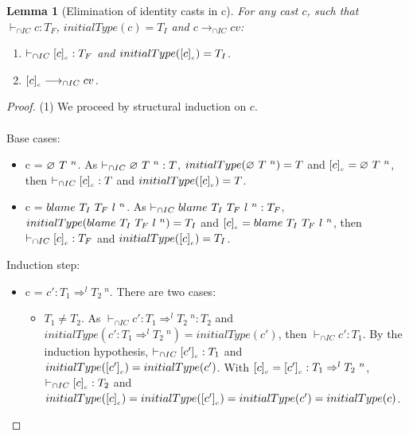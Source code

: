 \documentclass[a4paper]{article}
\newtheorem{lemma}{Lemma}
\begin{document}
\begin{lemma}[Elimination of identity casts in c]
\label{eliminationidentitycastsc}
For any cast $c$, such that $\vdash_{\cap IC} c : T_F$, $initialType(c) = T_I$ and $c \longrightarrow_{\cap IC} cv$:
\begin{enumerate}
    \item $\vdash_{\cap IC} [c]_{_c} : T_F$ and $initialType([c]_{_c}) = T_I$.
    \item $[c]_{_c} \longrightarrow_{\cap IC} cv$.
\end{enumerate}
\end{lemma}
\begin{proof}
(1) We proceed by structural induction on $c$.\\\\
Base cases:
\begin{itemize}
    \item c = $\varnothing\ T\ ^{n}$.
    As $\vdash_{\cap IC} \varnothing\ T\ ^{n} : T$, $initialType(\varnothing\ T\ ^{n}) = T$ and $[c]_{_c} = \varnothing\ T\ ^{n}$, then $\vdash_{\cap IC} [c]_{_c} : T$ and $initialType([c]_{_c}) = T$.
    \item c = $blame\ T_I\ T_F\ l\ ^{n}$.
    As $\vdash_{\cap IC} blame\ T_I\ T_F\ l\ ^{n} : T_F$, $initialType(blame\ T_I\ T_F\ l\ ^{n}) = T_I$ and $[c]_{_c} = blame\ T_I\ T_F\ l\ ^{n}$, then $\vdash_{\cap IC} [c]_{_c} : T_F$ and $initialType([c]_{_c}) = T_I$.
    \begin{comment}
    \item c = $\stuckcast{T_I}{T_F}{n}$.
    As $\vdash_{\cap IC} \stuckcast{T_I}{T_F}{n} : T_F$, $initialType(\stuckcast{T_I}{T_F}{n}) = T_I$ and $\erasec{c} = \stuckcast{T_I}{T_F}{n}$, then $\vdash_{\cap IC} \erasec{c} : T_F$ and $initialType(\erasec{c}) = T_I$.
    \end{comment}
\end{itemize}
Induction step:
\begin{itemize}
    \item c = $c' : T_1 \Rightarrow^l T_2\ ^n$.
    There are two cases:
    \begin{itemize}
        \item $T_1 \neq T_2$.
        As $\vdash_{\cap IC} c' : T_1 \Rightarrow^l T_2\ ^n : T_2$ and $initialType(c' : T_1 \Rightarrow^l T_2\ ^n) = initialType(c')$, then $\vdash_{\cap IC} c' : T_1$.
        By the induction hypothesis, $\vdash_{\cap IC} [c']_{_c} : T_1$ and $initialType([c']_{_c}) = initialType(c')$.
        With $[c]_{_c} = [c']_{_c} : T_1 \Rightarrow^l T_2\ ^n$, $\vdash_{\cap IC} [c]_{_c} : T_2$ and $initialType([c]_{_c}) = initialType([c']_{_c}) = initialType(c') = initialType(c)$.

\end{itemize}
\end{itemize}
\end{proof}
\end{document}

